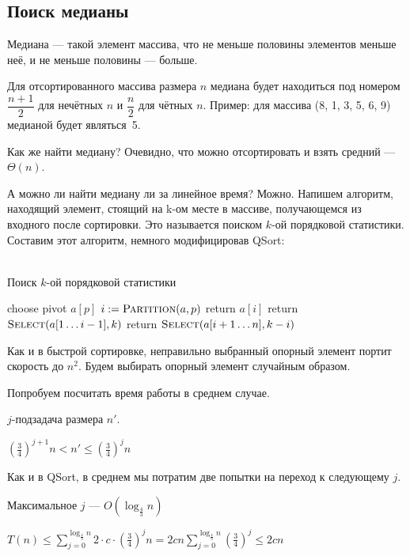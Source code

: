\documentclass[12pt,a4paper]{article}
\begin{document}
\subsection*{Поиск медианы}

Медиана --- такой элемент массива, что не меньше половины элементов меньше неё, и не меньше половины --- больше.

Для отсортированного массива размера $n$ медиана будет  находиться под номером $\dfrac{n + 1}{2}$ для нечётных $n$ и $\dfrac{n}{2}$ для чётных $n$.
Пример: для массива (8, 1, 3, 5, 6, 9) медианой будет являться~5.

Как же найти медиану?
Очевидно, что можно отсортировать и взять средний --- $\Theta(n)$.

А можно ли найти медиану ли за линейное время?
Можно.
Напишем алгоритм, находящий элемент, стоящий на k-ом месте в массиве, получающемся из входного после сортировки.
Это называется поиском $k$-ой порядковой статистики.
Составим этот алгоритм, немного модифицировав QSort:\\\\

\begin{algorithm}
\caption{Поиск $k$-ой порядковой статистики}
\begin{algorithmic}[1]
	\State choose pivot $a[p]$
	\State $i \mathrel{:=} \textsc{Partition}(a, p)$
		\State return $a[i]$	
	\EndIf
		\State return $\textsc{Select}(a[1 \ldots i - 1], k)$
	\Else
		\State return $\textsc{Select}(a[i + 1 \ldots n], k - i)$
	\EndIf
\EndFunction
\end{algorithmic}
\end{algorithm}



Как и в быстрой сортировке, неправильно выбранный опорный элемент портит скорость до $n^2$. Будем выбирать опорный элемент случайным образом.

Попробуем посчитать время работы в среднем случае.

$j$-подзадача размера $n'$.

$\left( \frac{3}{4} \right)^{j+1}n < n' \leqslant \left( \frac{3}{4} \right)^{j}n$

Как и в QSort, в среднем мы потратим две попытки на переход к следующему $j$.

Максимальное $j$ --- $O(\log_\frac{4}{3} n)$

$T(n) \leqslant \sum\limits_{j=0}^{\log_{\frac{4}{3}}n} 2\cdot c\cdot \left( \frac{3}{4} \right)^jn = 2cn\sum\limits_{j=0}^{\log_{\frac{4}{3}}n}\left( \frac{3}{4} \right)^j \leqslant 2cn$
\end{document}

